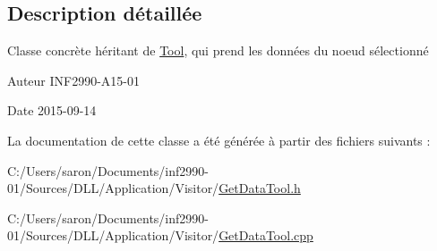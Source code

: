 \subsection{Description détaillée}
Classe concrète héritant de \hyperlink{class_tool}{Tool}, qui prend les données du noeud sélectionné 

\begin{DoxyAuthor}{Auteur}
I\-N\-F2990-\/\-A15-\/01 
\end{DoxyAuthor}
\begin{DoxyDate}{Date}
2015-\/09-\/14 
\end{DoxyDate}


La documentation de cette classe a été générée à partir des fichiers suivants \-:\begin{DoxyCompactItemize}
\item 
C\-:/\-Users/saron/\-Documents/inf2990-\/01/\-Sources/\-D\-L\-L/\-Application/\-Visitor/\hyperlink{_get_data_tool_8h}{Get\-Data\-Tool.\-h}\item 
C\-:/\-Users/saron/\-Documents/inf2990-\/01/\-Sources/\-D\-L\-L/\-Application/\-Visitor/\hyperlink{_get_data_tool_8cpp}{Get\-Data\-Tool.\-cpp}\end{DoxyCompactItemize}
